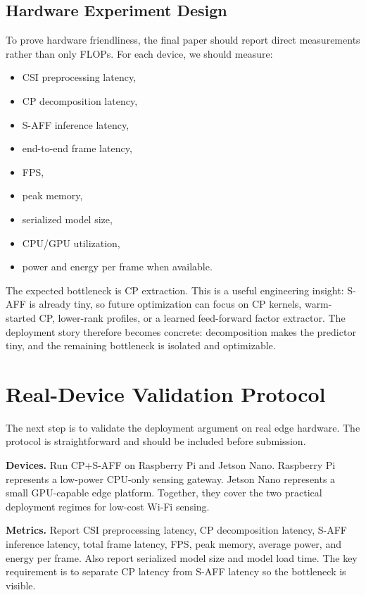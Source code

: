 \documentclass[10pt,conference]{IEEEtran}
\begin{document}
\subsection{Hardware Experiment Design}

To prove hardware friendliness, the final paper should report direct measurements rather than only FLOPs. For each device, we should measure:
\begin{itemize}
    \item CSI preprocessing latency,
    \item CP decomposition latency,
    \item S-AFF inference latency,
    \item end-to-end frame latency,
    \item FPS,
    \item peak memory,
    \item serialized model size,
    \item CPU/GPU utilization,
    \item power and energy per frame when available.
\end{itemize}

The expected bottleneck is CP extraction. This is a useful engineering insight: S-AFF is already tiny, so future optimization can focus on CP kernels, warm-started CP, lower-rank profiles, or a learned feed-forward factor extractor. The deployment story therefore becomes concrete: decomposition makes the predictor tiny, and the remaining bottleneck is isolated and optimizable.

\section{Real-Device Validation Protocol}

The next step is to validate the deployment argument on real edge hardware. The protocol is straightforward and should be included before submission.

\textbf{Devices.}
Run CP+S-AFF on Raspberry Pi and Jetson Nano. Raspberry Pi represents a low-power CPU-only sensing gateway. Jetson Nano represents a small GPU-capable edge platform. Together, they cover the two practical deployment regimes for low-cost Wi-Fi sensing.

\textbf{Metrics.}
Report CSI preprocessing latency, CP decomposition latency, S-AFF inference latency, total frame latency, FPS, peak memory, average power, and energy per frame. Also report serialized model size and model load time. The key requirement is to separate CP latency from S-AFF latency so the bottleneck is visible.
\end{document}
